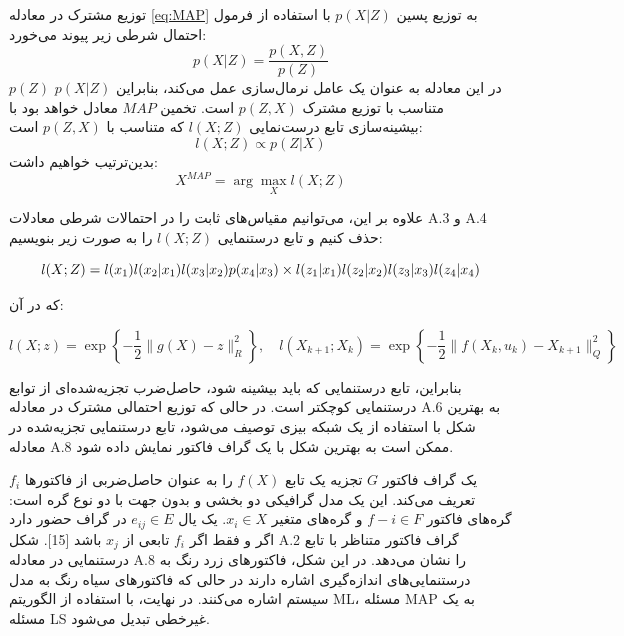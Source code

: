 توزیع مشترک در معادله
 \ref{eq:MAP}
 به توزیع پسین \(p(X|Z)\) با استفاده از فرمول احتمال شرطی زیر پیوند می‌خورد:
\begin{equation}
	p(X|Z) = \frac{p(X, Z)}{p(Z)}
\end{equation}
\(p(Z)\) در این معادله به عنوان یک عامل نرمال‌سازی عمل می‌کند، بنابراین \(p(X|Z)\) متناسب با توزیع مشترک \(p(Z, X)\) است. تخمین $MAP$ معادل خواهد بود با بیشینه‌سازی تابع درست‌نمایی \(l(X; Z)\) که متناسب با \(p(Z, X)\) است:
\begin{equation}
	l(X; Z) \propto p(Z|X)
\end{equation}
بدین‌ترتیب خواهیم داشت:
\begin{equation}
	X^{MAP} = \arg\max_X l(X; Z)
\end{equation}

علاوه بر این، می‌توانیم مقیاس‌های ثابت را در احتمالات شرطی معادلات A.3 و A.4 حذف کنیم و تابع درستنمایی \(l(X; Z)\) را به صورت زیر بنویسیم:

\begin{equation}
	l(X; Z) = l(x_1) l(x_2|x_1) l(x_3|x_2) p(x_4|x_3) \\
	\times l(z_1|x_1) l(z_2|x_2) l(z_3|x_3) l(z_4|x_4)
\end{equation}

که در آن:

\begin{equation}
	l(X; z) = \exp \left\{ -\frac{1}{2} \|g(X) - z \|_R^2 \right\}, \quad l(X_{k+1}; X_k) = \exp \left\{ -\frac{1}{2} \|f(X_k, u_k) - X_{k+1}\|_Q^2 \right\}
\end{equation}

بنابراین، تابع درستنمایی که باید بیشینه شود، حاصل‌ضرب تجزیه‌شده‌ای از توابع درستنمایی کوچکتر است. در حالی که توزیع احتمالی مشترک در معادله A.6 به بهترین شکل با استفاده از یک شبکه بیزی توصیف می‌شود، تابع درستنمایی تجزیه‌شده در معادله A.8 ممکن است به بهترین شکل با یک گراف فاکتور نمایش داده شود.

یک گراف فاکتور \(G\) تجزیه یک تابع \(f(X)\) را به عنوان حاصل‌ضربی از فاکتورها \(f_i\) تعریف می‌کند. این یک مدل گرافیکی دو بخشی و بدون جهت با دو نوع گره است: گره‌های فاکتور \(f - i \in F\) و گره‌های متغیر \(x_i \in X\). یک یال \(e_{ij} \in E\) در گراف حضور دارد اگر و فقط اگر \(f_i\) تابعی از \(x_j\) باشد [15]. شکل A.2 گراف فاکتور متناظر با تابع درستنمایی در معادله A.8 را نشان می‌دهد. در این شکل، فاکتورهای زرد رنگ به درستنمایی‌های اندازه‌گیری اشاره دارند در حالی که فاکتورهای سیاه رنگ به مدل سیستم اشاره می‌کنند.
در نهایت، با استفاده از الگوریتم ML، مسئله MAP به یک مسئله LS غیرخطی تبدیل می‌شود.






